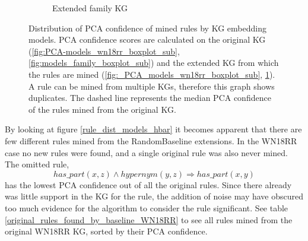 \begin{figure}[htbp]
\begin{subfigure}{.5\textwidth}
  \caption{Extended family KG}
  \label{fig:_PCA_models_family_boxplot_sub}
\end{subfigure}
\caption[Dist. of PCA conf. rules by KG embedding models]{Distribution of PCA confidence of mined rules by KG embedding models. PCA confidence scores are calculated on the original KG (\ref{fig:PCA-models_wn18rr_boxplot_sub}, \ref{fig:models_family_boxplot_sub}) and the extended KG from which the rules are mined (\ref{fig:_PCA_models_wn18rr_boxplot_sub}, \ref{fig:_PCA_models_family_boxplot_sub}). A rule can be mined from multiple KGs, therefore this graph shows duplicates. The dashed line represents the median PCA confidence of the rules mined from the original KG.}
\label{fig:PCA_models_boxplot}
\end{figure}

By looking at figure \ref{rule_dist_models_hbar} it becomes apparent that there are few different rules mined from the RandomBaseline extensions. In the WN18RR case no new rules were found, and a single original rule was also never mined. The omitted rule,
\[ has\_part(x, z) \wedge hypernym(y, z) \Rightarrow has\_part(x, y)\]
has the lowest PCA confidence out of all the original rules. Since there already was little support in the KG for the rule, the addition of noise may have obscured too much evidence for the algorithm to consider the rule significant. See table \ref{original_rules_found_by_baseline_WN18RR} to see all rules mined from the original WN18RR KG, sorted by their PCA confidence.

